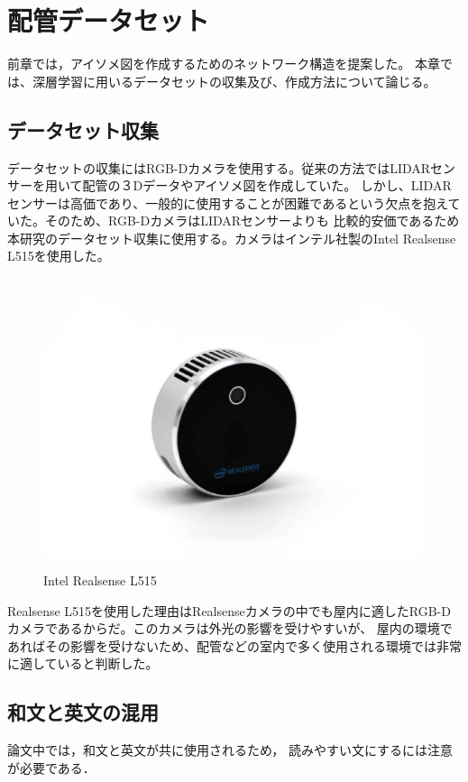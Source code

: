 \chapter{%
配管データセット}

前章では，アイソメ図を作成するためのネットワーク構造を提案した。
本章では、深層学習に用いるデータセットの収集及び、作成方法について論じる。


\section{データセット収集}
データセットの収集にはRGB-Dカメラを使用する。従来の方法ではLIDARセンサーを用いて配管の３Dデータやアイソメ図を作成していた。
しかし、LIDARセンサーは高価であり、一般的に使用することが困難であるという欠点を抱えていた。そのため、RGB-DカメラはLIDARセンサーよりも
比較的安価であるため本研究のデータセット収集に使用する。カメラはインテル社製のIntel Realsense L515を使用した。

\begin{figure}[htbt]
	\centering
	 \includegraphics[height=85mm]{realsense.eps}
	 \caption{Intel Realsense L515}
	 \label{fig:f2}
\end{figure}

Realsense L515を使用した理由はRealsenseカメラの中でも屋内に適したRGB-Dカメラであるからだ。このカメラは外光の影響を受けやすいが、
屋内の環境であればその影響を受けないため、配管などの室内で多く使用される環境では非常に適していると判断した。

\section{和文と英文の混用}

論文中では，和文と英文が共に使用されるため，
読みやすい文にするには注意が必要である．


